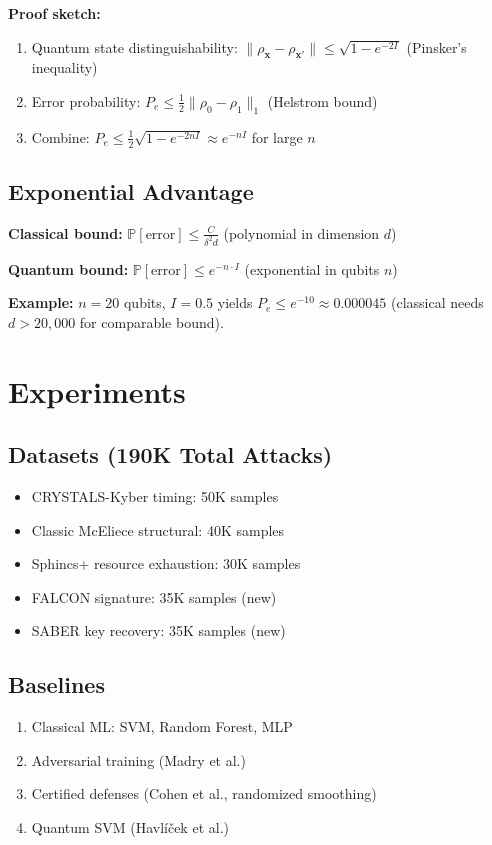 \documentclass[conference]{IEEEtran}
\begin{document}
\textbf{Proof sketch:}
\begin{enumerate}
\item Quantum state distinguishability: $\|\rho_{\mathbf{x}} - \rho_{\mathbf{x}'}\| \leq \sqrt{1 - e^{-2I}}$ (Pinsker's inequality)
\item Error probability: $P_e \leq \frac{1}{2}\|\rho_0 - \rho_1\|_1$ (Helstrom bound)
\item Combine: $P_e \leq \frac{1}{2}\sqrt{1 - e^{-2nI}} \approx e^{-nI}$ for large $n$
\end{enumerate}

\subsection{Exponential Advantage}
\textbf{Classical bound:} $\mathbb{P}[\text{error}] \leq \frac{C}{\delta^2 d}$ (polynomial in dimension $d$)

\textbf{Quantum bound:} $\mathbb{P}[\text{error}] \leq e^{-n \cdot I}$ (exponential in qubits $n$)

\textbf{Example:} $n=20$ qubits, $I=0.5$ yields $P_e \leq e^{-10} \approx 0.000045$ (classical needs $d > 20,000$ for comparable bound).

\section{Experiments}

\subsection{Datasets (190K Total Attacks)}
\begin{itemize}
\item CRYSTALS-Kyber timing: 50K samples
\item Classic McEliece structural: 40K samples
\item Sphincs+ resource exhaustion: 30K samples
\item FALCON signature: 35K samples (new)
\item SABER key recovery: 35K samples (new)
\end{itemize}

\subsection{Baselines}
\begin{enumerate}
\item Classical ML: SVM, Random Forest, MLP
\item Adversarial training (Madry et al.)
\item Certified defenses (Cohen et al., randomized smoothing)
\item Quantum SVM (Havlíček et al.)
\end{enumerate}
\end{document}
